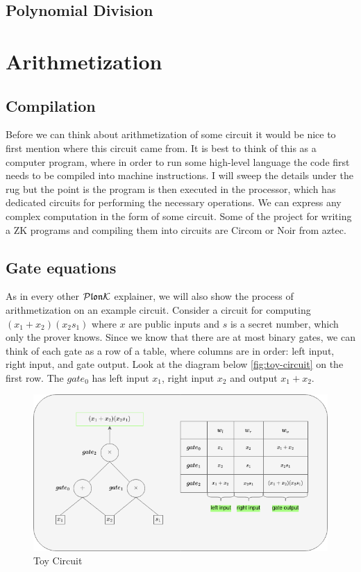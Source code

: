 \subsection{Polynomial Division}

\section{Arithmetization}
\label{chap:arithmetization}

\subsection{Compilation}
Before we can think about arithmetization of some circuit it would be nice to first mention where this circuit came from. It is best to think of this as a computer program, where in order to run some high-level language the code first needs to be compiled into machine instructions. I will sweep the details under the rug but the point is the program is then executed in the processor, which has dedicated circuits for performing the necessary operations. We can express any complex computation in the form of some circuit. Some of the project for writing a ZK programs and compiling them into circuits are Circom or Noir from aztec. 

\subsection{Gate equations}
As in every other $\mathcal{P}\mathfrak{lon}\mathcal{K}$ explainer, we will also show the process of arithmetization on an example circuit. Consider a circuit for computing $(x_1 + x_2)(x_2s_1)$ where $x$ are public inputs and $s$ is a secret number, which only the prover knows. Since we know that there are at most binary gates, we can think of each gate as a row of a table, where columns are in order: left input, right input, and gate output. Look at the diagram below \eqref{fig:toy-circuit} on the first row. The $gate_0$ has left input $x_1$, right input $x_2$ and output $x_1 + x_2$. 

\begin{figure}[H]
    \centering
    \includegraphics[width=1\linewidth]{figures/arithmetization.drawio.png}
    \caption{Toy Circuit}
    \label{fig:toy-circuit}
\end{figure}

